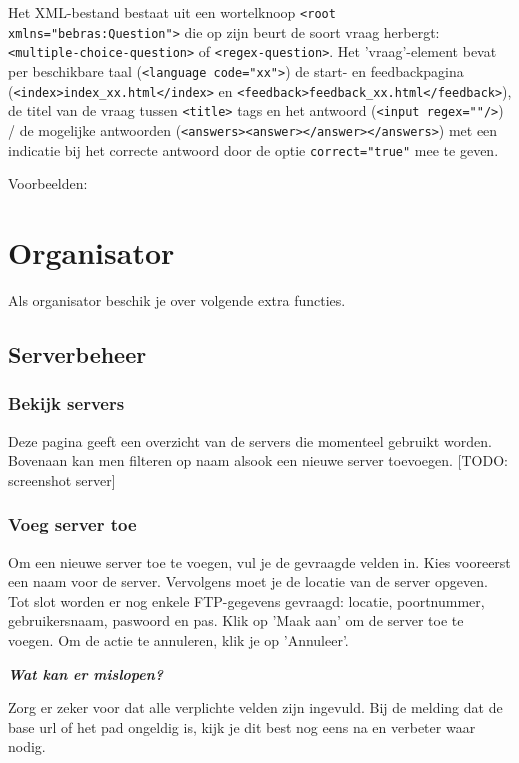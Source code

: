 \documentclass[]{article}
\begin{document}
Het XML-bestand bestaat uit een wortelknoop \verb+<root xmlns="bebras:Question">+ 
die op zijn beurt de soort vraag herbergt: \verb+<multiple-choice-question>+ of \verb+<regex-question>+.
Het 'vraag'-element bevat per beschikbare taal (\verb+<language code="xx">+) 
de start- en feedbackpagina (\verb+<index>index_xx.html</index>+ en \verb+<feedback>feedback_xx.html</feedback>+), 
de titel van de vraag tussen \verb+<title>+ tags 
en het antwoord (\verb+<input regex=""/>+) / de mogelijke antwoorden (\verb+<answers><answer></answer></answers>+)
met een indicatie bij het correcte antwoord door de optie \verb+correct="true"+ mee te geven.

Voorbeelden:

 

\section{Organisator}

Als organisator beschik je over volgende extra functies.

\subsection{Serverbeheer}

\subsubsection{Bekijk servers}
Deze pagina geeft een overzicht van de servers die momenteel gebruikt worden. Bovenaan kan men filteren op naam alsook een nieuwe server toevoegen. [TODO: screenshot server]

\subsubsection{Voeg server toe}
Om een nieuwe server toe te voegen, vul je de gevraagde velden in. Kies vooreerst een naam voor de server. Vervolgens moet je de locatie van de server opgeven. Tot slot worden er nog enkele FTP-gegevens gevraagd: locatie, poortnummer, gebruikersnaam, paswoord en pas. Klik op 'Maak aan' om de server toe te voegen. Om de actie te annuleren, klik je op 'Annuleer'.

\textbf{\textit{Wat kan er mislopen?}}

Zorg er zeker voor dat alle verplichte velden zijn ingevuld. Bij de melding dat de base url of het pad ongeldig is, kijk je dit best nog eens na en verbeter waar nodig.
\end{document}
